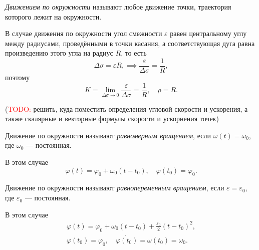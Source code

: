 \begin{definition}
  \textit{Движением по окружности} называют любое движение точки, траектория
  которого лежит на окружности.
\end{definition}

В случае движения по окружности угол смежности $\varepsilon$ равен центральному
углу между радиусами, проведёнными в точки касания, а соответствующая дуга
равна произведению этого угла на радиус $R$, то есть
\begin{equation*}
  \Delta \sigma = \varepsilon R, \implies
    \frac{\varepsilon}{\Delta \sigma} = \frac{1}{R},
\end{equation*}
поэтому
\begin{equation*}
  K = \lim_{\Delta \sigma \to 0} \frac{\varepsilon}{\Delta \sigma} =
    \frac{1}{R}, \quad \rho = R.
\end{equation*}

(\textcolor{red}{TODO:} решить, куда поместить определения угловой скорости и
ускорения, а также скалярные и векторные формулы скорости и ускорнения точек)

\begin{definition}
  Движение по окружности называют \textit{равномерным вращением}, если
  $\omega(t) = \omega_0$, где $\omega_0$ --- постоянная.

  В этом случае
  \begin{equation*}
    \varphi(t) = \varphi_0 + \omega_0 (t - t_0), \quad \varphi(t_0) = \varphi_0.
  \end{equation*}
\end{definition}

\begin{definition}
  Движение по окружности называют \textit{равнопеременным вращением}, если
  $\varepsilon = \varepsilon_0$, где $\varepsilon_0$ --- постоянная.

  В этом случае
  \begin{equation*}
    \begin{gathered}
      \varphi(t) = \varphi_0 + \omega_0 (t - t_0) +
        \frac{\varepsilon_0}{2} (t - t_0)^2, \\
      \varphi(t_0) = \varphi_0, \quad
        \dot{\varphi(t_0)} = \omega(t_0) = \omega_0.
    \end{gathered}
  \end{equation*}
\end{definition}

